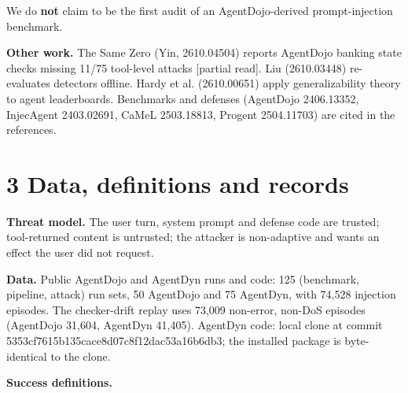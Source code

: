 \documentclass[11pt]{article}
\begin{document}
We do \textbf{not} claim to be the first audit of an AgentDojo-derived prompt-injection benchmark.

\textbf{Other work.} The Same Zero (Yin, 2610.04504) reports AgentDojo banking state checks missing 11/75 tool-level attacks {[}partial read{]}. Liu (2610.03448) re-evaluates detectors offline. Hardy et al. (2610.00651) apply generalizability theory to agent leaderboards. Benchmarks and defenses (AgentDojo 2406.13352, InjecAgent 2403.02691, CaMeL 2503.18813, Progent 2504.11703) are cited in the references.

\section{3 Data, definitions and records}\label{data-definitions-and-records}

\textbf{Threat model.} The user turn, system prompt and defense code are trusted; tool-returned content is untrusted; the attacker is non-adaptive and wants an effect the user did not request.

\textbf{Data.} Public AgentDojo and AgentDyn runs and code: 125 (benchmark, pipeline, attack) run sets, 50 AgentDojo and 75 AgentDyn, with 74,528 injection episodes. The checker-drift replay uses 73,009 non-error, non-DoS episodes (AgentDojo 31,604, AgentDyn 41,405). AgentDyn code: local clone at commit 5353cf7615b135cace8d07c8f12dac53a16b6db3; the installed package is byte-identical to the clone.

\textbf{Success definitions.}
\end{document}
